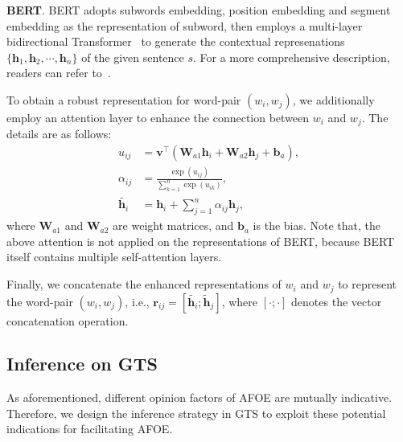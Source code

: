 \documentclass[11pt,a4paper]{article}
\begin{document}
\textbf{BERT}. BERT adopts subwords embedding, position embedding and segment embedding as the representation of subword, then employs a multi-layer bidirectional Transformer~\cite{DBLP:conf/nips/VaswaniSPUJGKP17} to generate the contextual represenations $\{\mathbf{h}_1, \mathbf{h}_2, \cdots, \mathbf{h}_n\}$ of the given sentence $s$. For a more comprehensive description, readers can refer to~.

To obtain a robust representation for word-pair $(w_i, w_j)$, we additionally employ an attention layer to enhance the connection between $w_i$ and $w_j$. The details are as follows:
\begin{align}
	u_{ij} &= \mathbf{v}^\top(\mathbf{W}_{a1}\mathbf{h}_i+ \mathbf{W}_{a2} \mathbf{h}_j+\mathbf{b}_a), \\
	\alpha_{ij} &= \frac{\exp(u_{ij})}{\sum_{k=1}^{n}\exp(u_{ik})}, \\
	\widetilde{\mathbf{h}_i} &= \mathbf{h}_i + \sum_{j=1}^{n}\alpha_{ij}\mathbf{h}_j,
\end{align}
where $\mathbf{W}_{a1}$ and $\mathbf{W}_{a2}$ are weight matrices, and $\mathbf{b}_a$ is the bias. Note that, the above attention is not applied on the representations of BERT, because BERT itself contains multiple self-attention layers.

Finally, we concatenate the enhanced representations of $w_i$ and $w_j$ to represent the word-pair $(w_i, w_j)$, i.e., $\mathbf{r}_{ij}=[\widetilde{\mathbf{h}_i}; \widetilde{\mathbf{h}}_j]$, where $[\cdot; \cdot]$ denotes the vector concatenation operation.

\subsection{Inference on GTS}
\label{inferenceongts}
As aforementioned, different opinion factors of AFOE are mutually indicative. Therefore, we design the inference strategy in GTS to exploit these potential indications for facilitating AFOE.
\end{document}
